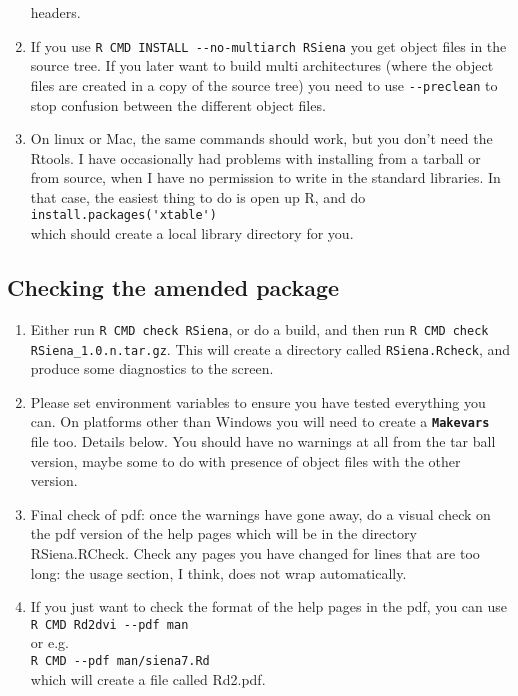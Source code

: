 \documentclass[12pt, a4paper]{article}
\renewcommand{\=}{\,=\,}
\newcommand{\+}{\,+\,}
\newcommand{\sfn}[1]{\textbf{\texttt{#1}}}
\begin{document}
\begin{enumerate}
  headers.
\item If you use \verb|R CMD INSTALL --no-multiarch RSiena|
you get object files in the source tree. If you later want to build multi
architectures (where the object files are created in a copy of the source tree)
you need to use \verb|--preclean| to stop confusion between the different object
files.
\item On linux or Mac, the same commands should work, but you don't need the
  Rtools. I have occasionally had problems with installing from a tarball or
  from source, when I have no permission to write in the standard libraries. In
  that case, the easiest thing to do is
  open up R, and do \\
\verb|install.packages('xtable')| \\which should create a
  local library directory for you.
\end{enumerate}
\subsection{Checking the amended package}
\begin{enumerate}
\item Either run \verb|R CMD check RSiena|, or do a build, and then
  run \verb|R CMD check RSiena_1.0.n.tar.gz|. This will create a directory
  called \verb|RSiena.Rcheck|, and produce some diagnostics to the
  screen.
\item Please set environment variables to ensure you have tested everything you
  can. On platforms other than Windows you will need to create a \sfn{Makevars}
  file too. Details below. You should have no warnings at all from
  the tar ball version, maybe some to do with presence of object files with the
  other version.
\item Final check of pdf: once the warnings have gone away, do a visual check on
  the pdf version of the help pages which will be in the directory
  RSiena.RCheck. Check any pages you have changed for lines that are too long:
  the usage section, I think, does not wrap automatically.
\item If you just want to check the format of the help pages in the pdf, you can
  use \\ \verb|R CMD Rd2dvi --pdf man| \\ or e.g.\ \\
  \verb|R CMD --pdf man/siena7.Rd|\\ which will create a file called Rd2.pdf.
\end{enumerate}
\end{document}
